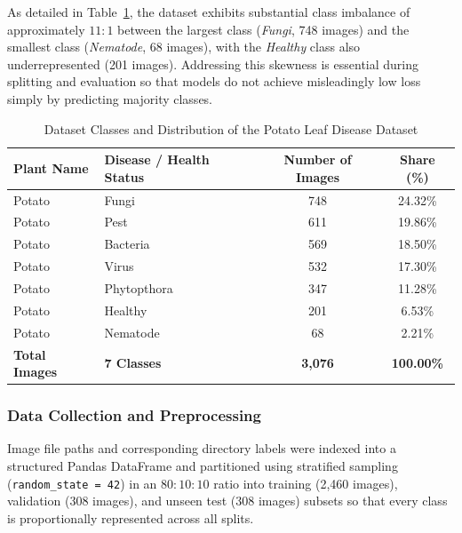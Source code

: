 As detailed in Table~\ref{tab:class_dist}, the dataset exhibits substantial class imbalance of approximately $11:1$ between the largest class (\textit{Fungi}, 748 images) and the smallest class (\textit{Nematode}, 68 images), with the \textit{Healthy} class also underrepresented (201 images). Addressing this skewness is essential during splitting and evaluation so that models do not achieve misleadingly low loss simply by predicting majority classes.

\begin{table}[htbp]
\caption{Dataset Classes and Distribution of the Potato Leaf Disease Dataset}
\label{tab:class_dist}
\begin{center}
\begin{tabularx}{0.9\textwidth}{| X | X | c | c |}
\hline
\textbf{Plant Name} & \textbf{Disease / Health Status} & \textbf{Number of Images} & \textbf{Share (\%)} \\
\hline
Potato & Fungi & 748 & 24.32\% \\
\hline
Potato & Pest & 611 & 19.86\% \\
\hline
Potato & Bacteria & 569 & 18.50\% \\
\hline
Potato & Virus & 532 & 17.30\% \\
\hline
Potato & Phytopthora & 347 & 11.28\% \\
\hline
Potato & Healthy & 201 & 6.53\% \\
\hline
Potato & Nematode & 68 & 2.21\% \\
\hline
\textbf{Total Images} & \textbf{7 Classes} & \textbf{3,076} & \textbf{100.00\%} \\
\hline
\end{tabularx}
\end{center}
\end{table}

\subsubsection{Data Collection and Preprocessing}
Image file paths and corresponding directory labels were indexed into a structured Pandas DataFrame and partitioned using stratified sampling (\texttt{random\_state = 42}) in an $80:10:10$ ratio into training (2,460 images), validation (308 images), and unseen test (308 images) subsets so that every class is proportionally represented across all splits.

